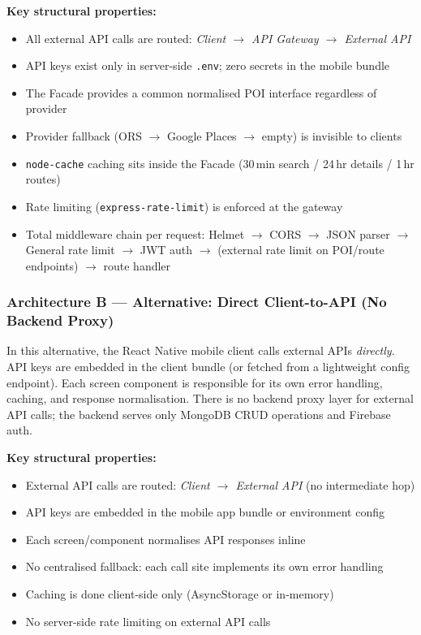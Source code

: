 \documentclass[12pt, a4paper]{article}
\newcommand{\code}[1]{\texttt{\small #1}}
\begin{document}
\textbf{Key structural properties:}
\begin{itemize}
  \item All external API calls are routed: \emph{Client $\to$ API Gateway $\to$ External API}
  \item API keys exist only in server-side \code{.env}; zero secrets in the mobile bundle
  \item The Facade provides a common normalised POI interface regardless of provider
  \item Provider fallback (ORS $\to$ Google Places $\to$ empty) is invisible to clients
  \item \code{node-cache} caching sits inside the Facade (30\,min search / 24\,hr details / 1\,hr routes)
  \item Rate limiting (\code{express-rate-limit}) is enforced at the gateway
  \item Total middleware chain per request: Helmet $\to$ CORS $\to$ JSON parser $\to$ General rate limit $\to$ JWT auth $\to$ (external rate limit on POI/route endpoints) $\to$ route handler
\end{itemize}

\subsubsection{Architecture B --- Alternative: Direct Client-to-API (No Backend Proxy)}

In this alternative, the React Native mobile client calls external APIs \emph{directly}. API keys are embedded in the client bundle (or fetched from a lightweight config endpoint). Each screen component is responsible for its own error handling, caching, and response normalisation. There is no backend proxy layer for external API calls; the backend serves only MongoDB CRUD operations and Firebase auth.

\textbf{Key structural properties:}
\begin{itemize}
  \item External API calls are routed: \emph{Client $\to$ External API} (no intermediate hop)
  \item API keys are embedded in the mobile app bundle or environment config
  \item Each screen/component normalises API responses inline
  \item No centralised fallback: each call site implements its own error handling
  \item Caching is done client-side only (AsyncStorage or in-memory)
  \item No server-side rate limiting on external API calls
\end{itemize}
\end{document}
